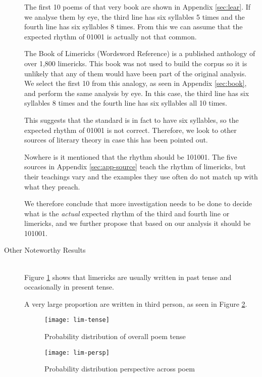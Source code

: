 \begin{description}
The first 10 poems of that very book are shown in Appendix \ref{sec:lear}. If we analyse them by eye, the third line has six syllables 5 times and the fourth line has six syllables 8 times. From this we can assume that the expected rhythm of 01001 is actually not that common.

The Book of Limericks (Wordsword Reference)\cite{marsh1997wordsworth} is a published anthology of over 1,800 limericks. This book was not used to build the corpus so it is unlikely that any of them would have been part of the original analysis. We select the first 10 from this analogy, as seen in Appendix \ref{sec:book}, and perform the same analysis by eye. In this case, the third line has six syllables 8 times and the fourth line has six syllables all 10 times.

This suggests that the standard is in fact to have six syllables, so the expected rhythm of 01001 is not correct. Therefore, we look to other sources of literary theory in case this has been pointed out.

Nowhere is it mentioned that the rhythm should be 101001. The five sources in Appendix \ref{sec:app-source} teach the rhythm of limericks, but their teachings vary and the examples they use often do not match up with what they preach.

We therefore conclude that more investigation needs to be done to decide what is the \textit{actual} expected rhythm of the third and fourth line or limericks, and we further propose that based on our analysis it should be 101001.

\item[Other Noteworthy Results]  \hfill \\
Figure \ref{fig:lim-tense} shows that limericks are usually written in past tense and occasionally in present tense.

A very large proportion are written in third person, as seen in Figure \ref{fig:lim-persp}.

\begin{figure}[H]
\centering
\texttt{[image: lim-tense]}
\caption{Probability distribution of overall poem tense}
\label{fig:lim-tense}
\end{figure}

\begin{figure}[H]
\centering
\texttt{[image: lim-persp]}
\caption{Probability distribution perspective across poem}
\label{fig:lim-persp}
\end{figure}

\end{description}



